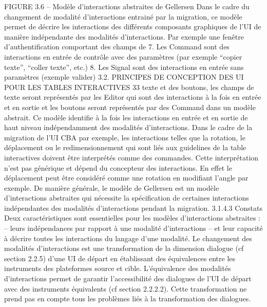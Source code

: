 \documentclass{article}
\begin{document}
 
FIGURE 3.6 – Mod\`{e}le d’interactions abstraites de Gellersen
Dans le cadre du changement de modalit\'{e} d’interactions entrain\'{e} par la migration, ce mod\`{e}le permet de d\'{e}crire les interactions des diff\'{e}rents composants graphiques de l’UI de mani\`{e}re ind\'{e}pendante
des modalit\'{e}s d’interactions. Par exemple une fen\^{e}tre d’authentiﬁcation comportant des champs de
7. Les Command sont des interactions en entr\'{e}e de contr\^{o}le avec des param\`{e}tres (par exemple “copier texte”, “coller
texte”, etc.)
8. Les Signal sont des interactions en entr\'{e}e sans param\`{e}tres (exemple valider)
3.2. PRINCIPES DE CONCEPTION DES UI POUR LES TABLES INTERACTIVES
33
texte et des boutons, les champs de texte seront repr\'{e}sent\'{e}s par les Editor qui sont des interactions \`{a} la
fois en entr\'{e}e et en sortie et les boutons seront repr\'{e}sent\'{e}s par des Command dans un mod\`{e}le abstrait.
Ce mod\`{e}le identiﬁe \`{a} la fois les interactions en entr\'{e}e et en sortie de haut niveau ind\'{e}pendamment
des modalit\'{e}s d’interactions. Dans le cadre de la migration de l’UI CBA par exemple, les interactions
telles que la rotation, le d\'{e}placement ou le redimensionnement qui sont li\'{e}s aux guidelines de la table
interactives doivent \^{e}tre interpr\'{e}t\'{e}s comme des commandes. Cette interpr\'{e}tation n’est pas g\'{e}n\'{e}rique
et d\'{e}pend du concepteur des interactions. En effet le d\'{e}placement peut \^{e}tre consid\'{e}r\'{e} comme une
rotation en modiﬁant l’angle par exemple. De mani\`{e}re g\'{e}n\'{e}rale, le mod\`{e}le de Gellersen est un mod\`{e}le d’interactions abstraites qui n\'{e}cessite la sp\'{e}ciﬁcation de certaines interactions ind\'{e}pendantes des
modalit\'{e}s d’interactions pendant la migration.
3.1.4.3
Constats
Deux caract\'{e}ristiques sont essentielles pour les mod\`{e}les d’interactions abstraites :
– leurs ind\'{e}pendances par rapport \`{a} une modalit\'{e} d’interactions
– et leur capacit\'{e} \`{a} d\'{e}crire toutes les interactions du langage d’une modalit\'{e}.
Le changement des modalit\'{e}s d’interactions est une transformation de la dimension dialogue (cf
section 2.2.5) d’une UI de d\'{e}part en \'{e}tablissant des \'{e}quivalences entre les instruments des plateformes
source et cible. L’\'{e}quivalence des modalit\'{e}s d’interactions permet de garantir l’accessibilit\'{e} des dialogues de l’UI de d\'{e}part avec des instruments \'{e}quivalents (cf section 2.2.2.2). Cette transformation ne
prend pas en compte tous les probl\`{e}mes li\'{e}s \`{a} la transformation des dialogues.
\end{document}
